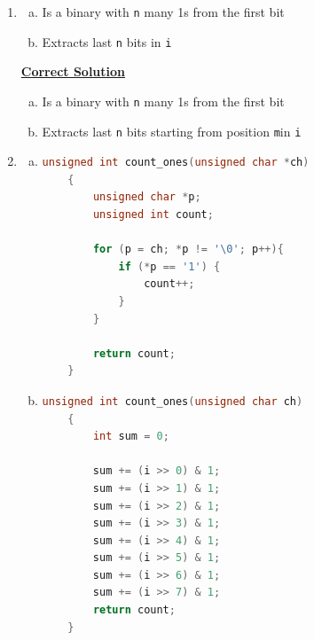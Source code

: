 \documentclass[12pt]{article}
\begin{document}
\begin{enumerate}[1.]
    \item

    \begin{enumerate}[a)]
        \item Is a binary with \texttt{n} many 1s from the first bit
        \item Extracts last \texttt{n} bits in \texttt{i}
    \end{enumerate}

    \bigskip

    \begin{mdframed}

    \underline{\textbf{Correct Solution}}

    \bigskip

    \begin{enumerate}[a)]
        \item Is a binary with \texttt{n} many 1s from the first bit
        \item Extracts last \texttt{n} bits \color{red}starting from position \texttt{m}\color{black}\:in \texttt{i}
    \end{enumerate}

    \end{mdframed}

    \item

    \begin{enumerate}[a)]
        \item

\begin{lstlisting}[language=c]
    unsigned int count_ones(unsigned char *ch)
    {
        unsigned char *p;
        unsigned int count;

        for (p = ch; *p != '\0'; p++){
            if (*p == '1') {
                count++;
            }
        }

        return count;
    }
\end{lstlisting}

        \item

\begin{lstlisting}[language=c]
    unsigned int count_ones(unsigned char ch)
    {
        int sum = 0;

        sum += (i >> 0) & 1;
        sum += (i >> 1) & 1;
        sum += (i >> 2) & 1;
        sum += (i >> 3) & 1;
        sum += (i >> 4) & 1;
        sum += (i >> 5) & 1;
        sum += (i >> 6) & 1;
        sum += (i >> 7) & 1;
        return count;
    }
\end{lstlisting}


\end{enumerate}
\end{enumerate}
\end{document}
